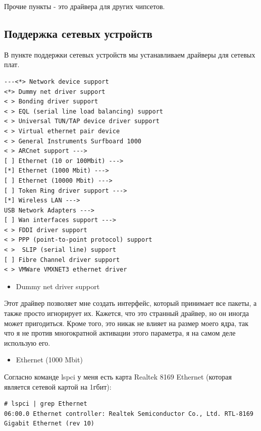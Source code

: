 \documentclass[10pt]{book}
\begin{document}
Прочие пункты - это драйвера для других чипсетов.

\subsection{Поддержка сетевых устройств}

В пункте поддержки сетевых устройств мы устанавливаем драйверы для сетевых плат.

\vspace{3mm}
\begin{tcolorbox}[colback=gray!14!white, colframe=blue!75!blue]
\begin{lstlisting}
---<*> Network device support
<*> Dummy net driver support
< > Bonding driver support
< > EQL (serial line load balancing) support
< > Universal TUN/TAP device driver support
< > Virtual ethernet pair device
< > General Instruments Surfboard 1000
< > ARCnet support --->
[ ] Ethernet (10 or 100Mbit) --->
[*] Ethernet (1000 Mbit) --->
[ ] Ethernet (10000 Mbit) --->
[ ] Token Ring driver support --->
[*] Wireless LAN --->
USB Network Adapters --->
[ ] Wan interfaces support --->
< > FDDI driver support
< > PPP (point-to-point protocol) support
< >  SLIP (serial line) support
[ ] Fibre Channel driver support
< > VMWare VMXNET3 ethernet driver
\end{lstlisting}
\end{tcolorbox}

\begin{itemize}
\item Dummy net driver support
\end{itemize}

Этот драйвер позволяет мне создать интерфейс, который принимает все пакеты, а также просто игнорирует их. Кажется, что это странный драйвер, но он иногда может пригодиться. Кроме того, это никак не влияет на размер моего ядра, так что я не против многократной активации этого параметра, я на самом деле использую его.

\begin{itemize}
\item Ethernet (1000 Mbit)
\end{itemize}

Согласно команде lspci у меня есть карта Realtek 8169 Ethernet (которая является сетевой картой на 1гбит):

\vspace{3mm}
\begin{tcolorbox}
\begin{lstlisting}
# lspci | grep Ethernet
06:00.0 Ethernet controller: Realtek Semiconductor Co., Ltd. RTL-8169 Gigabit Ethernet (rev 10)
\end{lstlisting}
\end{tcolorbox}
\end{document}
